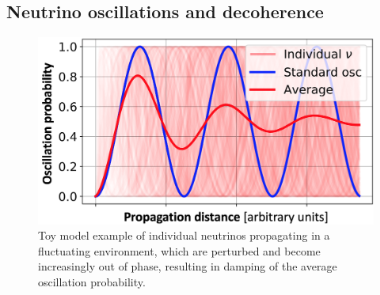 \documentclass[a4paper,11pt]{article}
\begin{document}


\subsection{Neutrino oscillations and decoherence}

\begin{figure} %
    \centering
		\vspace{-7pt}
		\includegraphics[width=1.\linewidth]{images/decoherence.png}
		\caption{Toy model example of individual neutrinos propagating in a fluctuating environment, which are perturbed and become increasingly out of phase, resulting in damping of the average oscillation probability.}
		\vspace{-5pt}
		\label{fig:decoherence}
\end{figure}
\end{document}
